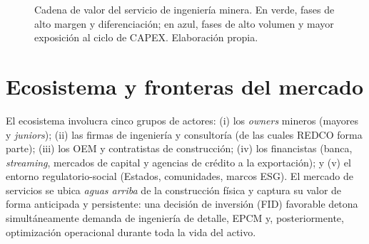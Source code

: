 \documentclass[11pt,letterpaper]{report}
\begin{document}
\begin{figure}[htbp]
\centering
{}
\caption[Cadena de valor del servicio de ingeniería minera]{Cadena de valor del servicio de ingeniería minera. En verde, fases de
alto margen y diferenciación; en azul, fases de alto volumen y mayor exposición al ciclo de CAPEX. Elaboración propia.}
\label{fig:cadena}
\end{figure}

\section{Ecosistema y fronteras del mercado}
El ecosistema involucra cinco grupos de actores: (i) los \emph{owners} mineros (mayores y \emph{juniors}); (ii) las firmas de
ingeniería y consultoría (de las cuales REDCO forma parte); (iii) los OEM y contratistas de construcción; (iv) los financistas
(banca, \emph{streaming}, mercados de capital y agencias de crédito a la exportación); y (v) el entorno regulatorio-social
(Estados, comunidades, marcos ESG). El mercado de servicios se ubica \emph{aguas arriba} de la construcción física y captura su
valor de forma anticipada y persistente: una decisión de inversión (FID) favorable detona simultáneamente demanda de ingeniería
de detalle, EPCM y, posteriormente, optimización operacional durante toda la vida del activo.
\end{document}
